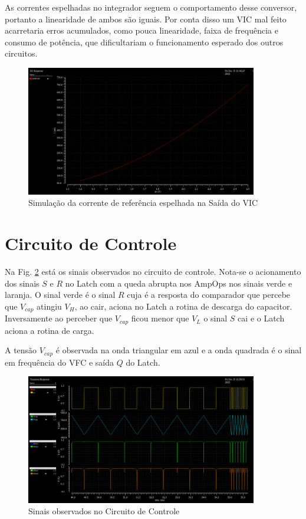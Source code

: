 As correntes espelhadas no integrador seguem o comportamento desse conversor, portanto a linearidade de ambos são iguais. Por conta disso um VIC mal feito acarretaria erros acumulados, como pouca linearidade, faixa de frequência e consumo de potência, que dificultariam o funcionamento esperado dos outros circuitos.


\begin{figure}[htb]
	\centering
	\includegraphics[width=0.9\textwidth]{figuras/sim_VIC.png}
	\caption{ Simulação da corrente de referência espelhada na Saída do VIC }
	\label{fig17}
\end{figure}

\section{Circuito de Controle}

Na Fig. \ref{fig18} está os sinais observados no circuito de controle. Nota-se o acionamento dos sinais $S$ e $R$ no Latch com a queda abrupta nos AmpOps nos sinais verde e laranja. O sinal verde é o sinal $R$ cuja é a resposta do comparador que percebe que $V_{cap}$ atingiu $V_H$, ao cair, aciona no Latch a rotina de descarga do capacitor. Inversamente ao perceber que $V_{cap}$ ficou menor que $V_L$ o sinal $S$ cai e o Latch aciona a rotina de carga.

A tensão $V_{cap}$ é observada na onda triangular em azul e a onda quadrada é o sinal em frequência do VFC e saída $Q$ do Latch.

\begin{figure}[htb]
	\centering
	\includegraphics[width=0.9\textwidth]{figuras/sim_controle.png}
	\caption{Sinais observados no Circuito de Controle }
	\label{fig18}
\end{figure}



